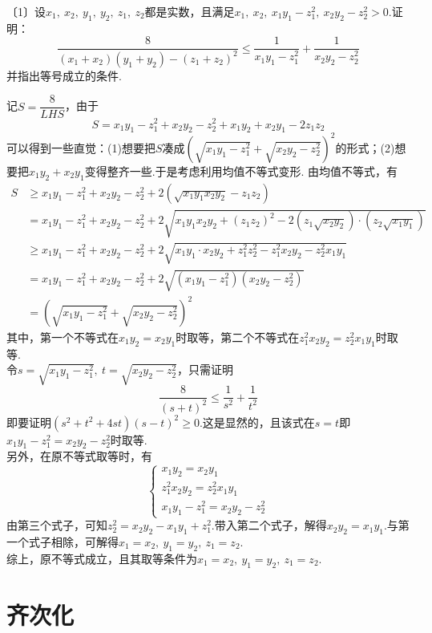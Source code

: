 \documentclass[cn,hazy,black,10pt,normal]{elegantnote}
\newenvironment{guess}{
  \color{guess}}{\newline \color{black}}
\newcommand{\nd}[1]{〔#1〕}
\begin{document}
\begin{problem} %
	\nd{1}设$x_1,~x_2,~y_1,~y_2,~z_1,~z_2$都是实数，且满足$x_1,~x_2,~x_1y_1-z_1^2,~x_2y_2-z_2^2 > 0$.证明：$$\frac{8}{(x_1+x_2)(y_1+y_2)-(z_1+z_2)^2} \leq \frac{1}{x_1y_1-z_1^2} + \frac{1}{x_2y_2-z_2^2} $$
	并指出等号成立的条件.
\end{problem}
\begin{solution}
	\begin{guess}
		记$S=\dfrac{8}{LHS}$，由于$$S = x_1y_1-z_1^2+x_2y_2-z_2^2+x_1y_2+x_2y_1-2z_1z_2$$
		可以得到一些直觉：(1)想要把$S$凑成$(\sqrt{x_1y_1-z_1^2} + \sqrt{x_2y_2-z_2^2})^2$的形式；(2)想要把$x_1y_2+x_2y_1$变得整齐一些.于是考虑利用均值不等式变形.
	\end{guess}
	由均值不等式，有
	\begin{align*}
		S &\geq x_1y_1-z_1^2+x_2y_2-z_2^2+2(\sqrt{x_1y_1x_2y_2}-z_1z_2) \\
		&= x_1y_1-z_1^2+x_2y_2-z_2^2+2\sqrt{x_1y_1x_2y_2 + (z_1z_2)^2 - 2(z_1\sqrt{x_2y_2}) \cdot (z_2 \sqrt{x_1y_1})} \\
		&\geq x_1y_1-z_1^2+x_2y_2-z_2^2+2\sqrt{x_1y_1 \cdot x_2y_2 + z_1^2z_2^2 - z_1^2x_2y_2 - z_2^2x_1y_1} \\
		&= x_1y_1-z_1^2+x_2y_2-z_2^2+2\sqrt{(x_1y_1-z_1^2)(x_2y_2-z_2^2)} \\
		&= (\sqrt{x_1y_1-z_1^2} + \sqrt{x_2y_2-z_2^2})^2
	\end{align*}
	其中，第一个不等式在$x_1y_2=x_2y_1$时取等，第二个不等式在$z_1^2x_2y_2=z_2^2x_1y_1$时取等. \\
	令$s=\sqrt{x_1y_1-z_1^2},~t=\sqrt{x_2y_2-z_2^2}$，只需证明$$\frac{8}{(s+t)^2} \leq \frac{1}{s^2} + \frac{1}{t^2}$$
	即要证明$(s^2+t^2+4st)(s-t)^2 \geq 0$.这是显然的，且该式在$s=t$即$x_1y_1-z_1^2=x_2y_2-z_2^2$时取等. \\
	另外，在原不等式取等时，有$$
	\begin{cases}
		x_1y_2=x_2y_1 \\
		z_1^2x_2y_2=z_2^2x_1y_1 \\
		x_1y_1-z_1^2=x_2y_2-z_2^2
	\end{cases}$$
	由第三个式子，可知$z_2^2=x_2y_2-x_1y_1+z_1^2$.带入第二个式子，解得$x_2y_2=x_1y_1$.与第一个式子相除，可解得$x_1=x_2,~y_1=y_2,~z_1=z_2$. \\
	综上，原不等式成立，且其取等条件为$x_1=x_2,~y_1=y_2,~z_1=z_2$.
\end{solution}

\section{齐次化}
\end{document}

